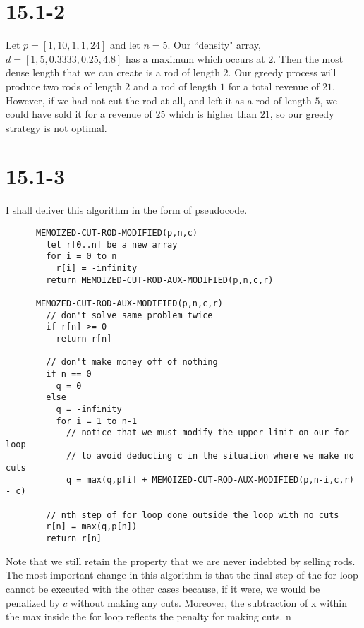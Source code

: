 \documentclass{article}
\begin{document}
  \section*{15.1-2}
    Let $p = [1,10,1,1,24]$ and let $n = 5$.
    Our ``density" array, $ d = [1,5,0.3333,0.25,4.8]$ has a maximum which occurs at $2$.
    Then the most dense length that we can create is a rod of length $2$.
    Our greedy process will produce two rods of length $2$ and a rod of length $1$ for a total revenue of $21$.
    However, if we had not cut the rod at all, and left it as a rod of length $5$, we could have sold it for a revenue of $25$ which is higher than $21$, so our greedy strategy is not optimal.

  \newpage
  \section*{15.1-3}
    I shall deliver this algorithm in the form of pseudocode.
    \begin{verbatim}
      MEMOIZED-CUT-ROD-MODIFIED(p,n,c)
        let r[0..n] be a new array
        for i = 0 to n
          r[i] = -infinity
        return MEMOIZED-CUT-ROD-AUX-MODIFIED(p,n,c,r)

      MEMOZED-CUT-ROD-AUX-MODIFIED(p,n,c,r)
        // don't solve same problem twice
        if r[n] >= 0
          return r[n]

        // don't make money off of nothing
        if n == 0
          q = 0
        else
          q = -infinity
          for i = 1 to n-1
            // notice that we must modify the upper limit on our for loop
            // to avoid deducting c in the situation where we make no cuts
            q = max(q,p[i] + MEMOIZED-CUT-ROD-AUX-MODIFIED(p,n-i,c,r) - c)

        // nth step of for loop done outside the loop with no cuts
        r[n] = max(q,p[n])
        return r[n]
    \end{verbatim}
    Note that we still retain the property that we are never indebted by selling rods.
    The most important change in this algorithm is that the final step of the for loop cannot be executed with the other cases because, if it were, we would be penalized by $c$ without making any cuts.
    Moreover, the subtraction of x within the max inside the for loop reflects the penalty for making cuts. 
n
\end{document}
